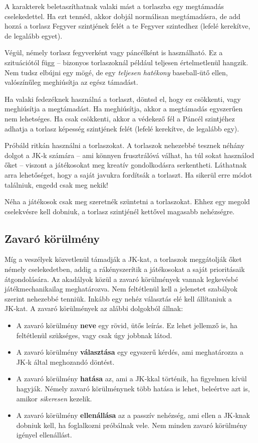 A karakterek beletaszíthatnak valaki mást a torlaszba egy megtámadás cselekedettel. Ha ezt tennéd, akkor dobjál normálisan megtámadásra, de add hozzá a torlasz Fegyver szintjének felét a te Fegyver szintedhez (lefelé kerekítve, de legalább egyet).

Végül, némely torlasz fegyverként vagy páncélként is használható. Ez a szituációtól függ – bizonyos torlaszoknál például teljesen értelmetlenül hangzik. Nem tudsz elbújni egy  mögé, de egy  \emph{teljesen hatékony} baseball‑ütő ellen, valószínűleg meghiúsítja az egész támadást.

Ha valaki fedezéknek használná a torlaszt, döntsd el, hogy ez csökkenti, vagy meghiúsítja a megtámadást. Ha meghiúsítja, akkor a megtámadás egyszerűen nem lehetséges. Ha csak csökkenti, akkor a védekező fél a Páncél szintjéhez adhatja a torlasz képesség szintjének felét (lefelé kerekítve, de legalább egy).

Próbáld ritkán használni a torlaszokat. A torlaszok nehezebbé tesznek néhány dolgot a JK‑k számára – ami könnyen frusztrálóvá válhat, ha túl sokat használod őket – viszont a játékosokat meg kreatív gondolkodásra serkentheti. Láthatnak arra lehetőséget, hogy a saját javukra fordítsák a torlaszt. Ha sikerül erre módot találniuk, engedd csak meg nekik!

Néha a játékosok csak meg szeretnék szüntetni a torlaszokat. Ehhez egy megold cselekvésre kell dobniuk, a torlasz szintjénél kettővel magasabb nehézségre.

\newpage

\subsection{Zavaró körülmény}

Míg a veszélyek közvetlenül támadják a JK‑kat, a torlaszok meggátolják őket némely cselekedetben, addig a  rákényszerítik a játékosokat a saját prioritásaik átgondolására. Az akadályok közül a zavaró körülmények vannak legkevésbé játékmechanikailag meghatározva. Nem feltétlenül kell a jelenetet szabályok szerint nehezebbé tenniük. Inkább egy nehéz választás elé kell állítaniuk a JK‑kat. A zavaró körülmények az alábbi dolgokból állnak:

\begin{itemize}
    \item A zavaró körülmény \textbf{neve} egy rövid, ütős leírás. Ez lehet jellemző is, ha feltétlenül szükséges, vagy csak úgy jobbnak látod.
    \item A zavaró körülmény \textbf{választása} egy egyszerű kérdés, ami meghatározza a JK‑k által meghozandó döntést.
    \item A zavaró körülmény \textbf{hatása} az, ami a JK‑kkal történik, ha figyelmen kívül hagyják. Némely zavaró körülménynek több hatása is lehet, beleértve azt is, amikor \emph{sikeresen} kezelik.
    \item A zavaró körülmény \textbf{ellenállása} az a passzív nehézség, ami ellen a JK‑knak dobniuk kell, ha foglalkozni próbálnak vele. Nem minden zavaró körülmény igényel ellenállást.
\end{itemize}

